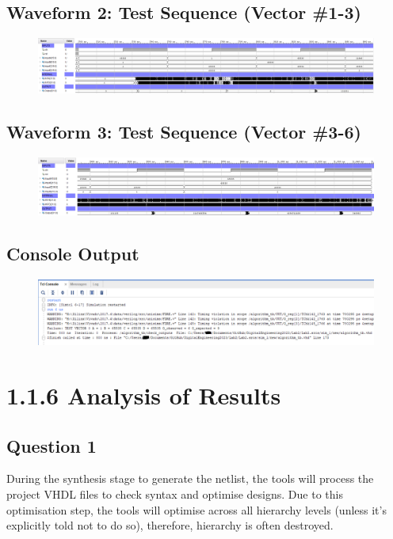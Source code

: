 \documentclass[11pt]{report}
\begin{document}
\subsection*{Waveform 2: Test Sequence (Vector \#1-3)}
\begin{figure}[H]
    \includegraphics[width=\columnwidth]{Reports/Lab2/Waveforms/50ns_timing_sim-test-sequence-1-3.png}
\end{figure}
\subsection*{Waveform 3: Test Sequence (Vector \#3-6)}
\begin{figure}[H]
    \includegraphics[width=\columnwidth]{Reports/Lab2/Waveforms/50ns_timing_sim-test-sequence-3-6.png}
\end{figure}
\subsection*{Console Output}
\begin{figure}[H]
    \includegraphics[width=\columnwidth]{Reports/Lab2/Waveforms/50ns_timing_sim-console.png}
\end{figure}


\section*{1.1.6 Analysis of Results}
\subsection*{Question 1}
During the synthesis stage to generate the netlist, the tools will process the project VHDL files to check syntax and optimise designs. Due to this optimisation step, the tools will optimise across all hierarchy levels (unless it's explicitly told not to do so), therefore, hierarchy is often destroyed. 
\end{document}
